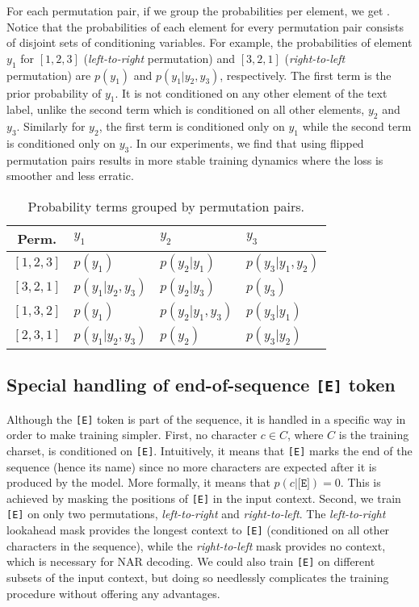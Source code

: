 For each permutation pair, if we group the probabilities per element, we get . Notice that the probabilities of each element for every permutation pair consists of disjoint sets of conditioning variables. For example, the probabilities of element $y_1$ for $[1,2,3]$  (\textit{left-to-right} permutation) and $[3,2,1]$ (\textit{right-to-left} permutation) are $p(y_1)$ and $p(y_1 | y_2, y_3)$, respectively. The first term is the prior probability of $y_1$. It is not conditioned on any other element of the text label, unlike the second term which is conditioned on all other elements, $y_2$ and $y_3$. Similarly for $y_2$, the first term is conditioned only on $y_1$ while the second term is conditioned only on $y_3$. In our experiments, we find that using flipped permutation pairs results in more stable training dynamics where the loss is smoother and less erratic.

\begin{table}[ht]
  \centering
  \setlength{\tabcolsep}{6pt}
  \caption{Probability terms grouped by permutation pairs.}
  \begin{tabular}{ c | l l l }
    \toprule
    Perm. & $y_1$ & $y_2$ & $y_3$ \\
    \midrule
    $[1,2,3]$ & $p(y_1)$ & $p(y_2 | y_1)$ & $p(y_3 | y_1, y_2)$ \\
    $[3,2,1]$ & $p(y_1 | y_2, y_3)$ & $p(y_2 | y_3)$ & $p(y_3)$ \\
    \midrule
    $[1,3,2]$ & $p(y_1)$ & $p(y_2 | y_1, y_3)$ & $p(y_3 | y_1)$ \\
    $[2,3,1]$ & $p(y_1 | y_2, y_3)$ & $p(y_2)$ & $p(y_3 | y_2)$ \\
    \bottomrule
  \end{tabular}
  \label{tab:grouped-probs}
\end{table}






\subsection{Special handling of end-of-sequence \texttt{[E]} token}

Although the \texttt{[E]} token is part of the sequence, it is handled in a specific way in order to make training simpler. First, no character $c \in C$, where $C$ is the training charset, is conditioned on \texttt{[E]}. Intuitively, it means that \texttt{[E]} marks the end of the sequence (hence its name) since no more characters are expected after it is produced by the model. More formally, it means that $p(c | \texttt{[E]}) = 0$. This is achieved by masking the positions of \texttt{[E]} in the input context. Second, we train \texttt{[E]} on only two permutations, \textit{left-to-right} and \textit{right-to-left}. The \textit{left-to-right} lookahead mask provides the longest context to \texttt{[E]} (conditioned on all other characters in the sequence), while the \textit{right-to-left} mask provides no context, which is necessary for NAR decoding. We could also train \texttt{[E]} on different subsets of the input context, but doing so needlessly complicates the training procedure without offering any advantages.

